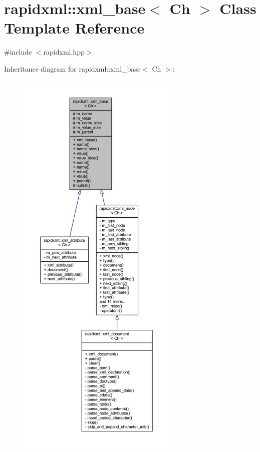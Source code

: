 \hypertarget{classrapidxml_1_1xml__base}{\section{rapidxml\+:\+:xml\+\_\+base$<$ Ch $>$ Class Template Reference}
\label{classrapidxml_1_1xml__base}
}


{\ttfamily \#include $<$rapidxml.\+hpp$>$}



Inheritance diagram for rapidxml\+:\+:xml\+\_\+base$<$ Ch $>$\+:
\nopagebreak
\begin{figure}[H]
\begin{center}
\leavevmode
\includegraphics[height=550pt]{classrapidxml_1_1xml__base__inherit__graph}
\end{center}
\end{figure}


